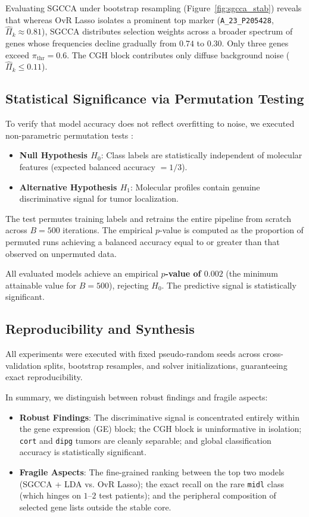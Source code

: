 \documentclass[a4paper,11pt]{paper}
\theoremstyle{plain}
\theoremstyle{definition}
\theoremstyle{remark}
\begin{document}
Evaluating SGCCA under bootstrap resampling (Figure~\ref{fig:sgcca_stab}) reveals that whereas OvR Lasso isolates a prominent top marker (\texttt{A\_23\_P205428}, $\hat \Pi_k \approx 0.81$), SGCCA distributes selection weights across a broader spectrum of genes whose frequencies decline gradually from $0.74$ to $0.30$. Only three genes exceed $\pi_{\text{thr}} = 0.6$. The CGH block contributes only diffuse background noise ($\hat \Pi_k \le 0.11$).

\subsection{Statistical Significance via Permutation Testing}

To verify that model accuracy does not reflect overfitting to noise, we executed non-parametric permutation tests \cite{ojala2010permutation}:
\begin{itemize}
    \item \textbf{Null Hypothesis $H_0$}: Class labels are statistically independent of molecular features (expected balanced accuracy $= 1/3$).
    \item \textbf{Alternative Hypothesis $H_1$}: Molecular profiles contain genuine discriminative signal for tumor localization.
\end{itemize}

The test permutes training labels and retrains the entire pipeline from scratch across $B = 500$ iterations. The empirical $p$-value is computed as the proportion of permuted runs achieving a balanced accuracy equal to or greater than that observed on unpermuted data.

All evaluated models achieve an empirical \textbf{$p$-value of $0.002$} (the minimum attainable value for $B = 500$), rejecting $H_0$. The predictive signal is statistically significant.

\subsection{Reproducibility and Synthesis}

All experiments were executed with fixed pseudo-random seeds across cross-validation splits, bootstrap resamples, and solver initializations, guaranteeing exact reproducibility.

In summary, we distinguish between robust findings and fragile aspects:
\begin{itemize}
    \item \textbf{Robust Findings}: The discriminative signal is concentrated entirely within the gene expression (GE) block; the CGH block is uninformative in isolation; \texttt{cort} and \texttt{dipg} tumors are cleanly separable; and global classification accuracy is statistically significant.
    \item \textbf{Fragile Aspects}: The fine-grained ranking between the top two models (SGCCA + LDA vs. OvR Lasso); the exact recall on the rare \texttt{midl} class (which hinges on $1$--$2$ test patients); and the peripheral composition of selected gene lists outside the stable core.
\end{itemize}
\end{document}
